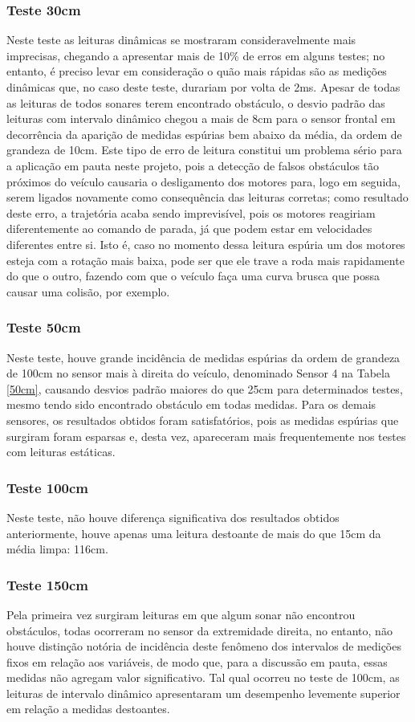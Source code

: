 \subsubsection{Teste 30cm}
Neste teste as leituras dinâmicas se mostraram consideravelmente mais imprecisas, chegando a apresentar mais de 10\% de erros em alguns testes; no 
entanto, é preciso levar em consideração o quão mais rápidas são as medições dinâmicas que, no caso deste teste, durariam por volta de 2ms.
Apesar de todas as leituras de todos sonares terem encontrado obstáculo, o desvio padrão das leituras com intervalo dinâmico chegou a mais de 8cm 
para o sensor frontal em decorrência da aparição de medidas espúrias bem abaixo da média, da ordem de grandeza de 10cm. 
Este tipo de erro de leitura constitui um problema sério para a aplicação em pauta neste projeto, pois a detecção de falsos obstáculos tão próximos 
do veículo causaria o desligamento dos motores para, logo em seguida, serem ligados novamente como consequência das leituras corretas; como resultado 
deste erro, a trajetória acaba sendo imprevisível, pois os motores reagiriam diferentemente ao comando de parada, já que podem estar em velocidades 
diferentes entre si. Isto é, caso no momento dessa leitura espúria um dos motores esteja com a rotação mais baixa, pode ser que ele trave a roda mais 
rapidamente do que o outro, fazendo com que o veículo faça uma curva brusca que possa causar uma colisão, por exemplo.
 
\subsubsection{Teste 50cm}
Neste teste, houve grande incidência de medidas espúrias da ordem de grandeza de 100cm no sensor mais à direita do veículo, denominado Sensor 4 na 
Tabela \ref{50cm}, causando desvios padrão maiores do que 25cm para determinados testes, mesmo tendo sido encontrado obstáculo em todas medidas.
Para os demais sensores, os resultados obtidos foram satisfatórios, pois as medidas espúrias que surgiram foram esparsas e, desta vez, apareceram 
mais frequentemente nos testes com leituras estáticas.
  
\subsubsection{Teste 100cm}
Neste teste, não houve diferença significativa dos resultados obtidos anteriormente, houve apenas uma leitura destoante de mais do que 15cm 
da média limpa: 116cm. 
  
\subsubsection{Teste 150cm}
Pela primeira vez surgiram leituras em que algum sonar não encontrou obstáculos, todas ocorreram no sensor da extremidade direita, no entanto, não 
houve distinção notória de incidência deste fenômeno dos intervalos de medições fixos em relação aos variáveis, de modo que, para a discussão em 
pauta, essas medidas não agregam valor significativo.
Tal qual ocorreu no teste de 100cm, as leituras de intervalo dinâmico apresentaram um desempenho levemente superior em relação a medidas destoantes.
  
